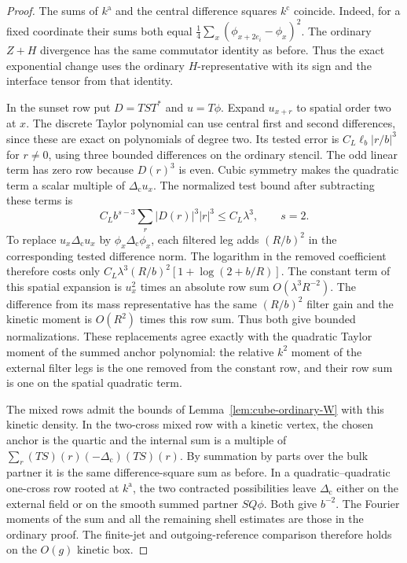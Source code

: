 \documentclass[11pt]{article}
\theoremstyle{definition}
\begin{document}
\begin{proof}
The sums of \(k^{\mathrm a}\) and the central difference squares
\(k^{\mathrm c}\) coincide. Indeed, for a fixed coordinate
their sums both equal
\(\tfrac14\sum_x(\phi_{x+2e_i}-\phi_x)^2\).
The ordinary \(Z+H\) divergence has the same commutator
identity as before. Thus the exact exponential change uses
the ordinary \(H\)-representative with its sign and the
interface tensor from that identity.

In the sunset row put \(D=TS T^*\) and \(u=T\phi\).
Expand \(u_{x+r}\) to spatial order two at \(x\). The
discrete Taylor polynomial can use central first and
second differences, since these are exact on polynomials of
degree two. Its tested error is
\(C_L\ell_b |r/b|^3\) for \(r\ne0\), using three bounded
differences on the ordinary stencil. The odd linear term has
zero row because \(D(r)^3\) is even. Cubic symmetry makes the
quadratic term a scalar multiple of \(\Delta_{\mathrm c}u_x\).
The normalized test bound after subtracting these terms is
\begin{equation}
 C_L b^{s-3}\sum_r |D(r)|^3|r|^3
       \le C_L\lambda^3,\qquad s=2 .
\end{equation}
To replace \(u_x\Delta_{\mathrm c}u_x\) by
\(\phi_x\Delta_{\mathrm c}\phi_x\), each filtered leg adds
\((R/b)^2\) in the corresponding tested difference norm.
The logarithm in the removed coefficient therefore costs
only \(C_L\lambda^3(R/b)^2[1+\log(2+b/R)]\).
The constant term of this spatial expansion is \(u_x^2\)
times an absolute row sum \(O(\lambda^3R^{-2})\).
The difference from its mass representative has the same
\((R/b)^2\) filter gain and the kinetic moment is
\(O(R^2)\) times this row sum. Thus both give bounded
normalizations. These replacements agree exactly with the
quadratic Taylor moment of the summed anchor polynomial:
the relative \(k^2\) moment of the external filter legs is
the one removed from the constant row, and their row sum
is one on the spatial quadratic term.

The mixed rows admit the bounds of
Lemma~\ref{lem:cube-ordinary-W} with this kinetic density.
In the two-cross mixed row with a kinetic vertex, the chosen
anchor is the quartic and the internal sum is a multiple of
\(\sum_r (TS)(r)(-\Delta_{\mathrm c})(TS)(r)\).
By summation by parts over the bulk partner it is the
same difference-square sum as before. In a quadratic--quadratic
one-cross row rooted at \(k^{\mathrm a}\), the two contracted
possibilities leave \(\Delta_{\mathrm c}\) either on the
external field or on the smooth summed partner \(SQ\phi\).
Both give \(b^{-2}\). The Fourier moments of the sum and
all the remaining shell estimates are those in the
ordinary proof. The finite-jet and outgoing-reference
comparison therefore holds on the \(O(g)\) kinetic box.
\end{proof}
\end{document}
